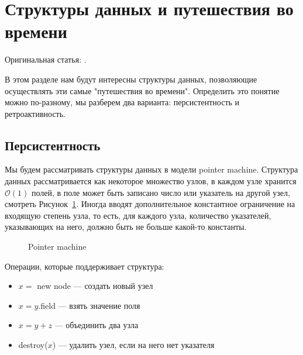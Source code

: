 \section{Структуры данных и путешествия во времени} 

Оригинальная статья: \cite{demaine2007retroactive}.

В этом разделе нам будут интересны структуры данных, позволяющие осуществлять эти самые "путешествия во времени".
Определить это понятие можно по-разному, мы разберем два варианта: персистентность и ретроактивность.

\subsection{Персистентность} \label{sec:persist}

Мы будем рассматривать структуры данных в модели pointer machine.
Структура данных рассматривается как некоторое множество узлов, в каждом узле хранится $\mathcal{O}(1)$ полей, в поле может быть записано число или указатель на другой узел, смотреть Рисунок~\ref{fig:TanyaPM}.
Иногда вводят дополнительное константное ограничение на входящую степень узла, то есть, для каждого узла, количество указателей, указывающих на него, должно быть не больше какой-то константы.

\begin{figure}[h] \centering
{}
	\caption{Pointer machine}
	\label{fig:TanyaPM}
\end{figure}

\vspace{10pt}
Операции, которые поддерживает структура: 

\begin{itemize}

\item $x = $ new node --- создать новый узел
\item $x = y.$field --- взять значение поля
\item $x = y + z$ --- объединить два узла
\item destroy($x$) --- удалить узел, если на него нет указателя

\end{itemize}

